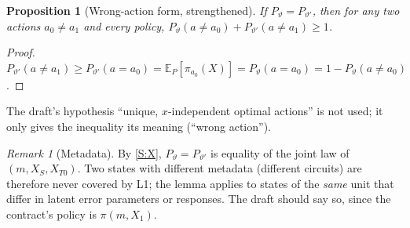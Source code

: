 \documentclass[11pt,a4paper]{article}
\newtheorem{proposition}[theorem]{Proposition}
\theoremstyle{definition}
\theoremstyle{remark}
\newtheorem{remark}[theorem]{Remark}
\newcommand{\E}{\mathbb{E}}
\newcommand{\vt}{\vartheta}
\begin{document}
\begin{proposition}[Wrong-action form, strengthened]\label{prop:wrong}
If $P_\vt=P_{\vt'}$, then for \emph{any} two actions $a_0\neq a_1$ and every policy,
$P_\vt(a\neq a_0)+P_{\vt'}(a\neq a_1)\ge1$.
\end{proposition}
\begin{proof}
$P_{\vt'}(a\neq a_1)\ge P_{\vt'}(a=a_0)=\E_P[\pi_{a_0}(X)]=P_\vt(a=a_0)=1-P_\vt(a\neq a_0)$.
\end{proof}
\noindent The draft's hypothesis ``unique, $x$-independent optimal actions'' is not used;
it only gives the inequality its meaning (``wrong action'').

\begin{remark}[Metadata]\label{rem:meta}
By \ref{S:X}, $P_\vt=P_{\vt'}$ is equality of the joint law of $(m,X_S,X_{T0})$. Two
states with different metadata (different circuits) are therefore never covered by L1;
the lemma applies to states of the \emph{same} unit that differ in latent error
parameters or responses. The draft should say so, since the contract's policy is
$\pi(m,X_1)$.
\end{remark}
\end{document}
